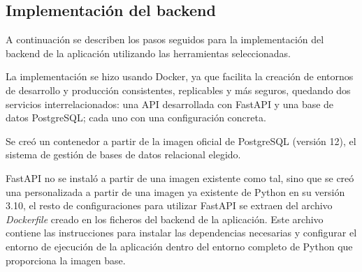 \subsection{Implementación del backend}
A continuación se describen los pasos seguidos para la implementación del backend de la aplicación utilizando las herramientas seleccionadas.

La implementación se hizo usando Docker, ya que facilita la creación de entornos de desarrollo y producción consistentes, replicables y más seguros, quedando dos servicios interrelacionados: una API desarrollada con FastAPI y una base de datos PostgreSQL; cada uno con una configuración concreta. 

Se creó un contenedor a partir de la imagen oficial de PostgreSQL (versión 12), el sistema de gestión de bases de datos relacional elegido.

FastAPI no se instaló a partir de una imagen existente como tal, sino que se creó una personalizada a partir de una imagen ya existente de Python en su versión 3.10, el resto de configuraciones para utilizar FastAPI se extraen del archivo \textit{Dockerfile} creado en los ficheros del backend de la aplicación. Este archivo contiene las instrucciones para instalar las dependencias necesarias y configurar el entorno de ejecución de la aplicación dentro del entorno completo de Python que proporciona la imagen base. 

